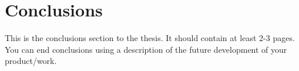 \section*{Conclusions}


This is the conclusions section to the thesis. It should contain at least 2-3 pages. You can end conclusions using a description of the future development of your product/work.



\clearpage